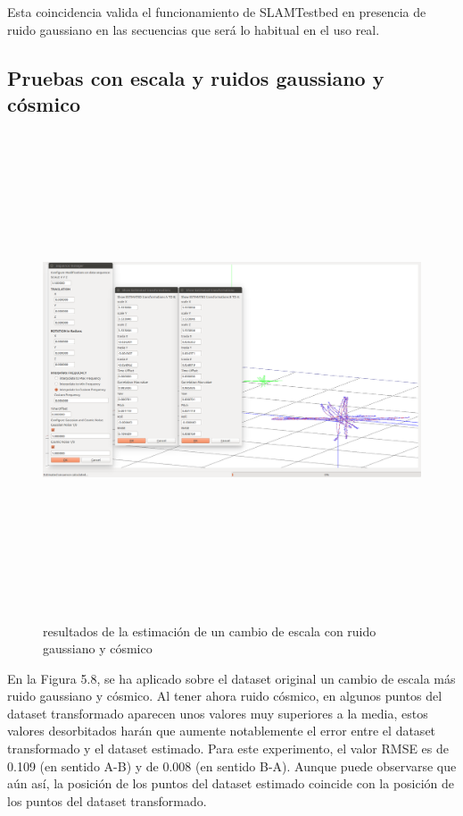 Esta coincidencia valida el funcionamiento de SLAMTestbed en presencia de ruido gaussiano en las secuencias que será lo habitual en el uso real.

\subsection{Pruebas con escala y ruidos gaussiano y cósmico}
\begin{figure}[H]
\begin{center}
\label{fig:opciones de View}\includegraphics[height=14.0cm,width=18.0cm]{img/cap6/Escala_GaussCosmicNoise_abba.png}
\hspace{0.5cm}

\end{center}

\caption{resultados de la estimación de un cambio de escala con ruido gaussiano y cósmico}
\end{figure}

En la Figura 5.8, se ha aplicado sobre el dataset original un cambio de escala más ruido gaussiano y cósmico. Al tener ahora ruido cósmico, en algunos puntos del dataset transformado aparecen unos valores muy superiores a la media, estos valores desorbitados harán que aumente notablemente el error entre el dataset transformado y el dataset estimado.
Para este experimento, el valor RMSE es de 0.109 (en sentido A-B) y de 0.008 (en sentido B-A). Aunque puede observarse que aún así, la posición de los puntos del dataset estimado coincide con la posición de los puntos del dataset transformado.


